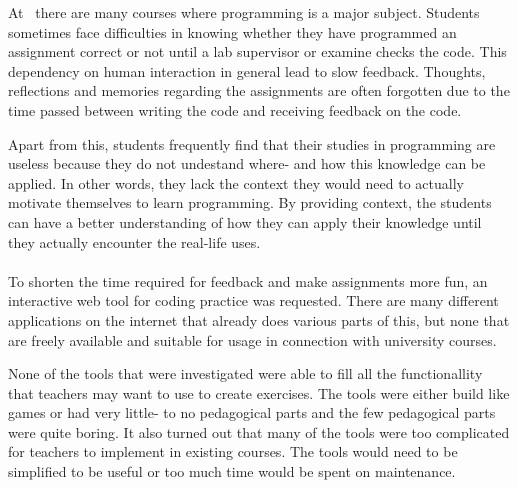 At \LTU\ there are many courses where programming is a major subject. Students sometimes face difficulties in knowing whether they have programmed an assignment correct or not until a lab supervisor or examine checks the code. This dependency on human interaction in general lead to slow feedback. Thoughts, reflections and memories regarding the assignments are often forgotten due to the time passed between writing the code and receiving feedback on the code.

Apart from this, students frequently find that their studies in programming are useless because they do not undestand where- and how this knowledge can be applied. In other words, they lack the context they would need to actually motivate themselves to learn programming. By providing context, the students can have a better understanding of how they can apply their knowledge until they actually encounter the real-life uses.\\
\\
To shorten the time required for feedback and make assignments more fun, an interactive web tool for coding practice was requested. There are many different applications on the internet that already does various parts of this, but none that are freely available and suitable for usage in connection with university courses.

None of the tools that were investigated were able to fill all the functionallity that teachers may want to use to create exercises. The tools were either build like games or had very little- to no pedagogical parts and the few pedagogical parts were quite boring. It also turned out that many of the tools were too complicated for teachers to implement in existing courses. The tools would need to be simplified to be useful or too much time would be spent on maintenance.

